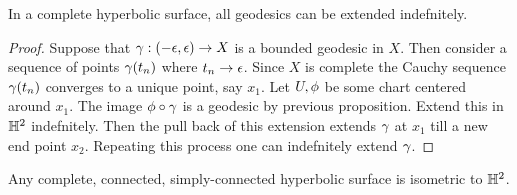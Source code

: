 \begin{theorem}
  In a complete hyperbolic surface, all geodesics can be extended indefnitely.
\end{theorem}
\begin{proof}
  Suppose that $\gamma: (-\epsilon, \epsilon)\to X$ is a bounded geodesic in $X$. Then consider a sequence of points $\gamma(t_n)$ where $t_n \to \epsilon$. Since $X$ is complete the Cauchy sequence $\gamma(t_n)$ converges to a unique point, say $x_1$. Let $U,\phi$ be some chart centered around $x_1$. The image $\phi\circ \gamma$ is a geodesic by previous proposition. Extend this in $\mathbb{H}^2$ indefnitely. Then the pull back of this extension extends $\gamma$ at $x_1$ till a new end point $x_2$. Repeating this process one can indefnitely extend $\gamma$.
\end{proof}
\begin{theorem}
  Any complete, connected, simply-connected hyperbolic surface is isometric to $\mathbb{H}^2$.
\end{theorem}
